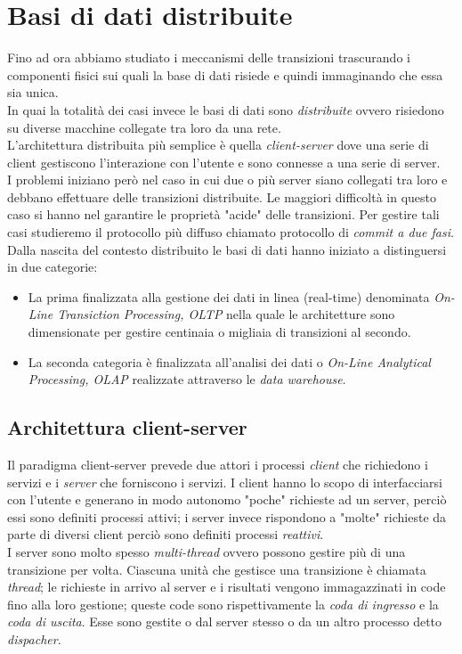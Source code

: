 \label{capitolo2}
\section{Basi di dati distribuite}
Fino ad ora abbiamo studiato i meccanismi delle transizioni trascurando i componenti fisici sui quali la base di dati risiede e quindi immaginando che essa sia unica.\\
In quai la totalità dei casi invece le basi di dati sono \emph{distribuite} ovvero risiedono su diverse macchine collegate tra loro da una rete.\\
L'architettura distribuita più semplice è quella \emph{client-server} dove una serie di client gestiscono l'interazione con l'utente e sono connesse a una serie di server.\\
I problemi iniziano però nel caso in cui due o più server siano collegati tra loro e debbano effettuare delle transizioni distribuite. Le maggiori difficoltà in questo caso si hanno nel garantire le proprietà "acide" delle transizioni. Per gestire tali casi studieremo il protocollo più diffuso chiamato protocollo di \emph{commit a due fasi}.
Dalla nascita del contesto distribuito le basi di dati hanno iniziato a distinguersi in due categorie:
\begin{itemize}
\item La prima finalizzata alla gestione dei dati in linea (real-time) denominata \emph{On-Line Transiction Processing, OLTP} nella quale le architetture sono dimensionate per gestire centinaia o migliaia di transizioni al secondo.
\item La seconda categoria è finalizzata all'analisi dei dati o \emph{On-Line Analytical Processing, OLAP} realizzate attraverso le \emph{data warehouse}.
\end{itemize}
\subsection{Architettura client-server}
Il paradigma client-server prevede due attori i processi \emph{client} che richiedono i servizi e i \emph{server} che forniscono i servizi. I client hanno lo scopo di interfacciarsi con l'utente e generano in modo autonomo "poche" richieste ad un server, perciò essi sono definiti processi attivi; i server invece rispondono a "molte" richieste da parte di diversi client perciò sono definiti processi \emph{reattivi}.\\
I server sono molto spesso \emph{multi-thread} ovvero possono gestire più di una transizione per volta. Ciascuna unità che gestisce una transizione è chiamata \emph{thread}; le richieste in arrivo al server e i risultati vengono immagazzinati in code fino alla loro gestione; queste code sono rispettivamente la \emph{coda di ingresso} e la \emph{coda di uscita}. Esse sono gestite o dal server stesso o da un altro processo detto \emph{dispacher}.
